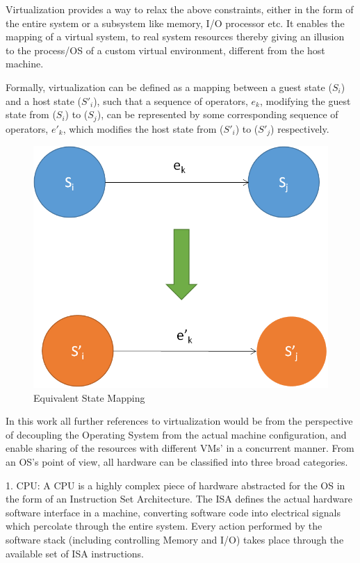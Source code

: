 Virtualization provides a way to relax the above constraints, either in the form of the entire system or a subsystem like memory, I/O processor etc. It enables the mapping of a virtual system, to real system resources thereby giving an illusion to the process/OS of a custom virtual environment, different from the host machine.

Formally, virtualization can be defined as a mapping between a guest state ($S_i$) and a host state ($S'_i$), such that a sequence of operators, $e_k$, modifying the guest state from ($S_i$) to ($S_j$), can be represented by some corresponding sequence of operators, $e'_k$, which modifies the host state from ($S'_i$) to ($S'_j$) respectively. 

\setlength{\belowcaptionskip}{-10pt}

\begin{figure}[H]
  \centering
  \includegraphics[scale=0.6]{figures/vir_phy_map.png}
  \caption{Equivalent State Mapping}
  \label{fig:statemap}
\end{figure}

In this work all further references to virtualization would be from the perspective of decoupling the Operating System from the actual machine configuration, and enable sharing of the resources with different VMs’ in a concurrent manner. From an OS's point of view, all hardware can be classified into three broad categories. 

1. CPU: A CPU is a highly complex piece of hardware abstracted for the OS in the form of an Instruction Set Architecture. The ISA defines the actual hardware software interface in a machine, converting software code into electrical signals which percolate through the entire system. Every action performed by the software stack (including controlling Memory and I/O) takes place through the available set of ISA instructions. 

